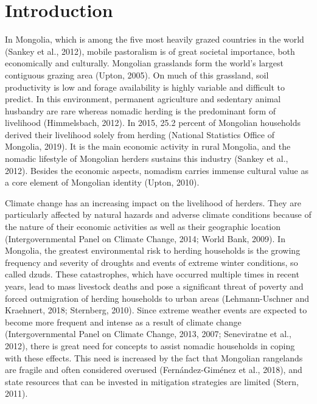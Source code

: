 \documentclass[]{elsarticle} %
\begin{document}
\hypertarget{introduction}{%
\section{Introduction}\label{introduction}}

In Mongolia, which is among the five most heavily grazed countries in
the world (Sankey et al., 2012), mobile pastoralism is of great societal
importance, both economically and culturally. Mongolian grasslands form
the world's largest contiguous grazing area (Upton, 2005). On much of
this grassland, soil productivity is low and forage availability is
highly variable and difficult to predict. In this environment, permanent
agriculture and sedentary animal husbandry are rare whereas nomadic
herding is the predominant form of livelihood (Himmelsbach, 2012). In
2015, 25.2 percent of Mongolian households derived their livelihood
solely from herding (National Statistics Office of Mongolia, 2019). It
is the main economic activity in rural Mongolia, and the nomadic
lifestyle of Mongolian herders sustains this industry (Sankey et al.,
2012). Besides the economic aspects, nomadism carries immense cultural
value as a core element of Mongolian identity (Upton, 2010).

Climate change has an increasing impact on the livelihood of herders.
They are particularly affected by natural hazards and adverse climate
conditions because of the nature of their economic activities as well as
their geographic location (Intergovernmental Panel on Climate Change,
2014; World Bank, 2009). In Mongolia, the greatest environmental risk to
herding households is the growing frequency and severity of droughts and
events of extreme winter conditions, so called dzuds. These
catastrophes, which have occurred multiple times in recent years, lead
to mass livestock deaths and pose a significant threat of poverty and
forced outmigration of herding households to urban areas
(Lehmann-Uschner and Kraehnert, 2018; Sternberg, 2010). Since extreme
weather events are expected to become more frequent and intense as a
result of climate change (Intergovernmental Panel on Climate Change,
2013, 2007; Seneviratne et al., 2012), there is great need for concepts
to assist nomadic households in coping with these effects. This need is
increased by the fact that Mongolian rangelands are fragile and often
considered overused (Fernández-Giménez et al., 2018), and state
resources that can be invested in mitigation strategies are limited
(Stern, 2011).
\end{document}
